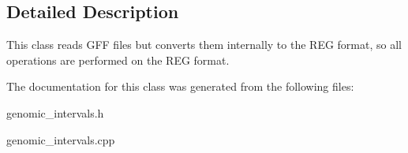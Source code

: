 \subsection{Detailed Description}
This class reads GFF files but converts them internally to the REG format, so all operations are performed on the REG format. 

The documentation for this class was generated from the following files:\begin{CompactItemize}
\item 
genomic\_\-intervals.h\item 
genomic\_\-intervals.cpp\end{CompactItemize}
